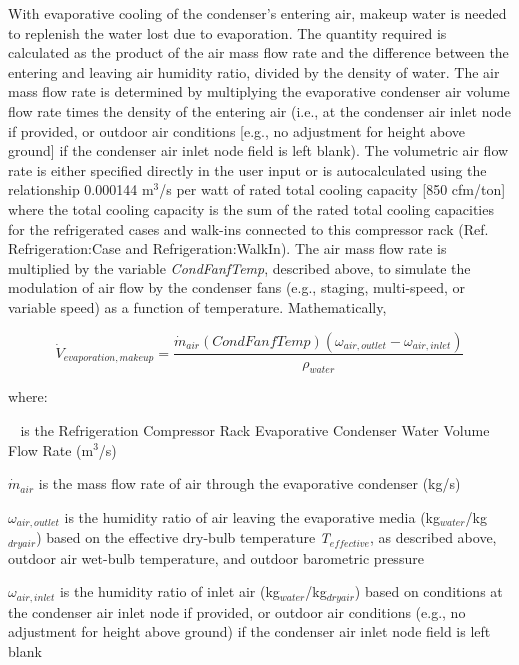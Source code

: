 With evaporative cooling of the condenser's entering air, makeup water is needed to replenish the water lost due to evaporation. The quantity required is calculated as the product of the air mass flow rate and the difference between the entering and leaving air humidity ratio, divided by the density of water. The air mass flow rate is determined by multiplying the evaporative condenser air volume flow rate times the density of the entering air (i.e., at the condenser air inlet node if provided, or outdoor air conditions {[}e.g., no adjustment for height above ground{]} if the condenser air inlet node field is left blank). The volumetric air flow rate is either specified directly in the user input or is autocalculated using the relationship 0.000144 m\(^{3}\)/s per watt of rated total cooling capacity {[}850 cfm/ton{]} where the total cooling capacity is the sum of the rated total cooling capacities for the refrigerated cases and walk-ins connected to this compressor rack (Ref. Refrigeration:Case and Refrigeration:WalkIn). The air mass flow rate is multiplied by the variable \emph{CondFanfTemp}, described above, to simulate the modulation of air flow by the condenser fans (e.g., staging, multi-speed, or variable speed) as a function of temperature. Mathematically,

\begin{equation}
{\dot V_{evaporation,makeup}} = \frac{{{{\dot m}_{air}}\left( {CondFanfTemp} \right)({\omega_{air,outlet}} - {\omega_{air,inlet}})}}{{{\rho_{water}}}}
\end{equation}

where:

\(\mathop {{{\dot V}_{evaporation,makeup}}}\limits^{}\) is the Refrigeration Compressor Rack Evaporative Condenser Water Volume Flow Rate (m\(^{3}\)/s)

\(\dot m_{air}\)  is the mass flow rate of air through the evaporative condenser (kg/s)

\({\omega_{air,outlet}}\) is the humidity ratio of air leaving the evaporative media (kg\(_{water}\)/kg\(_{dry air}\)) based on the effective dry-bulb temperature \emph{T\(_{effective}\)}, as described above, outdoor air wet-bulb temperature, and outdoor barometric pressure

\({\omega_{air,inlet}}\) is the humidity ratio of inlet air (kg\(_{water}\)/kg\(_{dry air}\)) based on conditions at the condenser air inlet node if provided, or outdoor air conditions (e.g., no adjustment for height above ground) if the condenser air inlet node field is left blank


